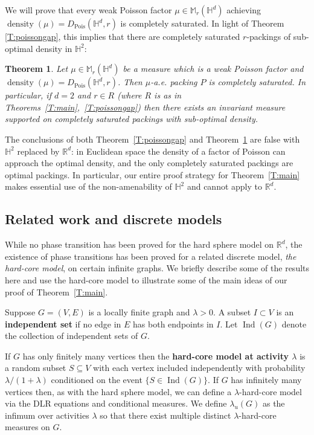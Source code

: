 \documentclass[11pt]{amsart}
\newtheorem{theorem}{Theorem}
\theoremstyle{definition}
\theoremstyle{remark}
\renewcommand{\H}{\mathbb{H}}
\newcommand{\R}{\mathbb{R}}
\newcommand{\M}{\mathbb{M}}
\newcommand{\Ind}{\operatorname{Ind}}
\newcommand{\density}{\operatorname{density}}
\newcommand{\Pois}{\operatorname{Pois}}
\newcommand{\lam}{\lambda}
\begin{document}
We will prove that every weak Poisson factor $\mu \in \M_r(\H^d)$ achieving $\density(\mu) = D_{\Pois}(\H^d,r)$ is completely saturated.  In light of Theorem \ref{T:poissongap}, this implies that there are completely saturated $r$-packings of sub-optimal density in $\H^2$:

\begin{theorem}
    \label{T:saturated}
    Let $\mu \in \M_r(\H^d)$ be a measure which is a weak Poisson factor and $\density(\mu)=D_{\Pois}(\H^d,r)$. Then $\mu$-a.e. packing $P$ is completely saturated. In particular, if $d=2$ and $r \in R$ (where $R$ is as in Theorems~\ref{T:main},~\ref{T:poissongap}) then there exists an invariant measure supported on  completely saturated  packings with sub-optimal density.
\end{theorem}


The conclusions of both Theorem~\ref{T:poissongap} and Theorem~\ref{T:saturated} are false with $\H^2$ replaced by $\R^d$: in Euclidean space the density of a  factor of Poisson can approach the optimal density, and the only completely saturated packings are optimal packings.  In particular, our entire proof strategy for Theorem~\ref{T:main} makes essential use of the non-amenability of $\H^2$ and cannot apply to $\R^d$.















\subsection{Related work and discrete models}

While no phase transition has been proved for the hard sphere model on $\R^d$, the existence of phase transitions has been proved for a related discrete model, \emph{the hard-core model}, on certain infinite graphs.  We briefly describe some of the results here and use the hard-core model to illustrate some of the main ideas of our proof of Theorem~\ref{T:main}.

Suppose $G=(V,E)$ is a locally finite graph and $\lambda>0$. A subset $I \subset V$ is an {\bf independent set} if no edge in $E$ has both endpoints in $I$. Let $\Ind(G)$ denote the collection of independent sets of $G$.

If $G$ has only finitely many vertices then the {\bf hard-core model at activity $\lambda$} is 
a random subset $S \subseteq V$ with each vertex included independently with probability $\lam/(1+\lam)$ conditioned on the event $\{ S \in \Ind(G) \}$. If $G$ has infinitely many vertices then, as with the hard sphere model, we can define a $\lam$-hard-core model via the DLR equations and conditional measures. We define $\lam_u(G)$ as the infimum over activities $\lam$ so that there exist multiple distinct $\lam$-hard-core measures on $G$.
\end{document}
